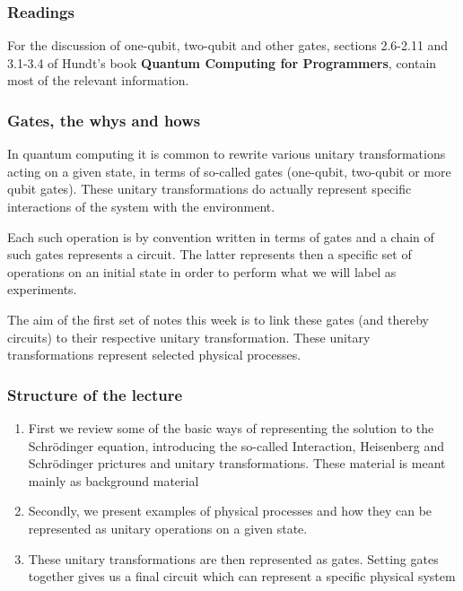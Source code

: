 \documentclass{beamer}
\begin{document}
\begin{frame}
\frametitle{Readings}

For the discussion of one-qubit, two-qubit and other gates, sections
2.6-2.11 and 3.1-3.4 of Hundt's book \textbf{Quantum Computing for Programmers},
contain most of the relevant information.
\end{frame}

\begin{frame}
\frametitle{Gates, the whys and hows}

In quantum computing it is common to rewrite various unitary
transformations acting on a given state, in terms of so-called gates
(one-qubit, two-qubit or more qubit gates). These unitary
transformations do actually represent specific interactions of the system with the
environment.

Each such operation is by convention written in terms of gates and a
chain of such gates represents a circuit. The latter represents then a
specific set of operations on an initial state in order to perform what we will label
as experiments.

The aim of the first set of notes this week is to link these gates
(and thereby circuits) to their respective unitary
transformation. These unitary transformations represent selected
physical processes.
\end{frame}

\begin{frame}
\frametitle{Structure of the lecture}

\begin{enumerate}
\item First we review some of the basic ways of representing the solution to the Schrödinger equation, introducing the so-called Interaction, Heisenberg and Schrödinger prictures and unitary transformations. These material is meant mainly as background material

\item Secondly, we present examples of physical processes and how they can be represented as unitary operations on a given state.

\item These unitary transformations are then represented as gates. Setting gates together gives us a final circuit which can represent a specific physical system
\end{enumerate}

\noindent
\end{frame}
\end{document}
